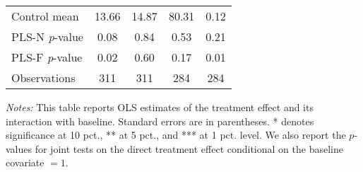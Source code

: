 \begin{table}[ht]
{\begin{threeparttable}
\begin{tabular}{l*{4}{c}}
Control mean    &    13.66         &    14.87         &    80.31         &     0.12         \\
PLS-N \emph{p}-value&     0.08         &     0.84         &     0.53         &     0.21         \\
PLS-F \emph{p}-value&     0.02         &     0.60         &     0.17         &     0.01         \\
Observations    &      311         &      311         &      284         &      284         \\
\bottomrule \end{tabular} \begin{tablenotes}[flushleft] \footnotesize \item \emph{Notes:} This table reports OLS estimates of the treatment effect and its interaction with baseline. Standard errors are in parentheses. * denotes significance at 10 pct., ** at 5 pct., and *** at 1 pct. level. We also report the \(p\)-values for joint tests on the direct treatment effect conditional on the baseline covariate $= 1$. \end{tablenotes} \end{threeparttable} } \end{table}

